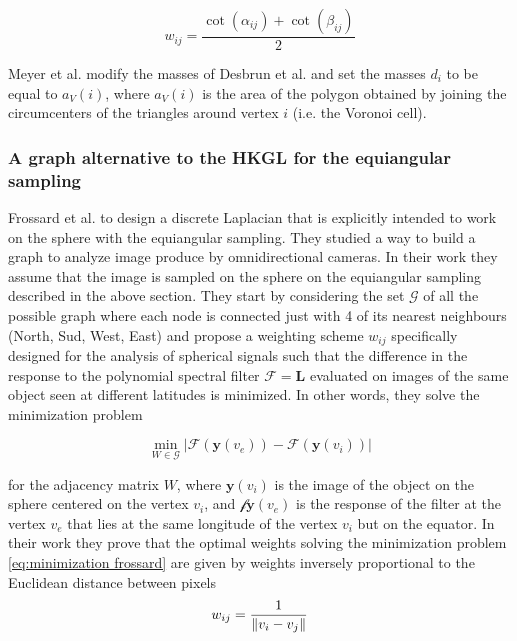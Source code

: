 $$w_{i j}=\frac{\cot \left(\alpha_{i j}\right)+\cot \left(\beta_{i j}\right)}{2}$$

Meyer et al. \cite{Meyer02discretedifferential-geometry} modify the masses of Desbrun et al. and set the masses $d_i$ to be equal to $a_{V}(i)$, where \(a_{V}(i)\) is the area of the polygon obtained by joining the circumcenters of the triangles around vertex $i$ (i.e. the Voronoi cell).


\subsubsection{A graph alternative to the HKGL for the equiangular sampling}
Frossard et al. \cite{Frossard2017GraphBasedCO} to design a discrete Laplacian that is explicitly intended to work on the sphere with the equiangular sampling. They studied a way to build a graph to analyze image produce by omnidirectional cameras. In their work they assume that the image is sampled on the sphere on the equiangular sampling described in the above section. They start by considering the set $\mathcal G$ of all the possible graph where each node is connected just with 4 of its nearest neighbours (North, Sud, West, East) and propose a weighting scheme $w_{ij}$ specifically designed for the analysis of spherical signals such that the difference in the response to the polynomial spectral filter $\mathcal F = \mathbf L$ evaluated on images of the same object seen at different latitudes is minimized. In other words, they solve the minimization problem 

\begin{equation}\label{eq:minimization frossard}
	\min_{W\in\mathcal G} \left|\mathcal{F}\left(\mathbf{y}\left(v_{ e}\right)\right)-\mathcal{F}\left(\mathbf{y}\left(v_{ i}\right)\right)\right|
\end{equation}

for the adjacency matrix $W$, where $\mathbf y(v_i)$ is the image of the object on the sphere centered on the vertex $v_i$, and $\mathcal f\mathbf y(v_e)$ is the response of the filter at the vertex $v_e$ that lies at the same longitude of the vertex $v_i$ but on the equator. In their work they prove that the optimal weights solving the minimization problem \ref{eq:minimization frossard} are given by weights inversely proportional to the Euclidean distance between pixels
$$
w_{ij} = \frac{1}{\left\lVert v_i-v_j\right\rVert}
$$

